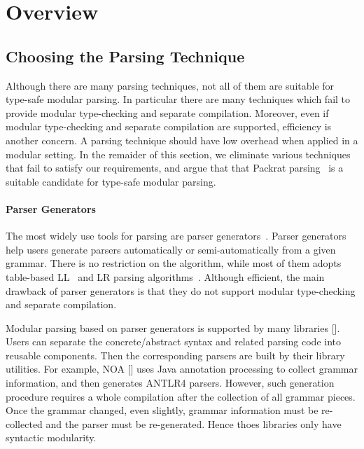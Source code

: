 \section{Overview}\label{sec:overview}

\subsection{Choosing the Parsing Technique}\label{subsec:overview-parsing}


Although there are many parsing techniques, not all of them are
suitable for type-safe modular parsing. In particular there are many
techniques which fail to provide modular type-checking and separate
compilation. Moreover, even if modular type-checking and separate
compilation are supported, efficiency is another
concern. A parsing technique should have low overhead when applied
in a modular setting. In the remaider of this section, we eliminate
various techniques that fail to satisfy our requirements, and argue
that that Packrat parsing~\cite{} is a suitable candidate for
type-safe modular parsing.

\paragraph{Parser Generators} The most widely use tools for parsing
are parser generators~\cite{}. Parser generators help users generate parsers automatically or
semi-automatically from a given grammar. There is no restriction on
the algorithm, while most of them adopts table-based LL~\cite{} and LR parsing
algorithms~\cite{}.
Although efficient, the main drawback of parser generators is that they do not support
modular type-checking and separate compilation.

Modular parsing based on parser generators is supported by many libraries []. Users can separate the concrete/abstract syntax and related parsing code into reusable components. Then the corresponding parsers are built by their library utilities. For example, NOA [] uses Java annotation processing to collect grammar information, and then generates ANTLR4 parsers. However, such generation procedure requires a whole compilation after the collection of all grammar pieces. Once the grammar changed, even slightly, grammar information must be re-collected and the parser must be re-generated. Hence thoes libraries only have syntactic modularity.

